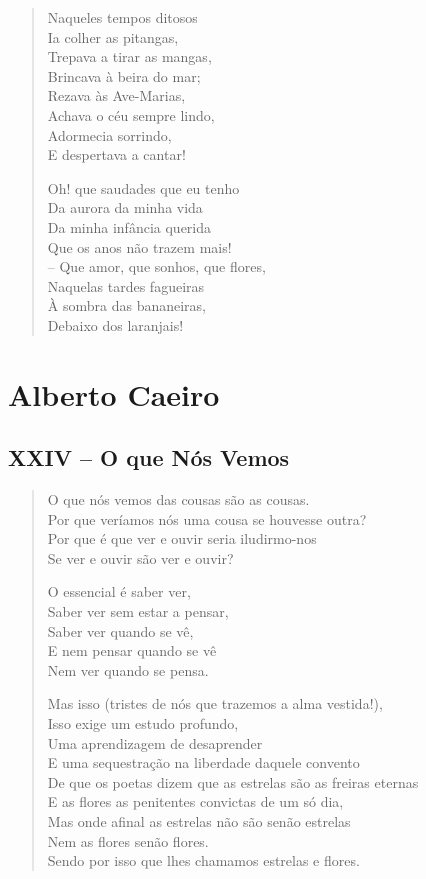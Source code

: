 \documentclass[10pt,a5paper,oneside]{book}
\begin{document}
\begin{verse}
Naqueles tempos ditosos\\
Ia colher as pitangas,\\
Trepava a tirar as mangas,\\
Brincava à beira do mar;\\
Rezava às Ave-Marias,\\
Achava o céu sempre lindo,\\
Adormecia sorrindo,\\
E despertava a cantar!

Oh! que saudades que eu tenho\\
Da aurora da minha vida\\
Da minha infância querida\\
Que os anos não trazem mais!\\
-- Que amor, que sonhos, que flores,\\
Naquelas tardes fagueiras\\
À sombra das bananeiras,\\
Debaixo dos laranjais!
\end{verse}

\part{Alberto Caeiro}

\chapter{XXIV -- O que Nós Vemos}

\begin{verse}
O que nós vemos das cousas são as cousas.\\
Por que veríamos nós uma cousa se houvesse outra?\\
Por que é que ver e ouvir seria iludirmo-nos\\
Se ver e ouvir são ver e ouvir?

O essencial é saber ver,\\
Saber ver sem estar a pensar,\\
Saber ver quando se vê,\\
E nem pensar quando se vê\\
Nem ver quando se pensa.

Mas isso (tristes de nós que trazemos a alma vestida!),\\
Isso exige um estudo profundo,\\
Uma aprendizagem de desaprender\\
E uma sequestração na liberdade daquele convento\\
De que os poetas dizem que as estrelas são as freiras eternas\\
E as flores as penitentes convictas de um só dia,\\
Mas onde afinal as estrelas não são senão estrelas\\
Nem as flores senão flores.\\
Sendo por isso que lhes chamamos estrelas e flores.
\end{verse}
\end{document}
